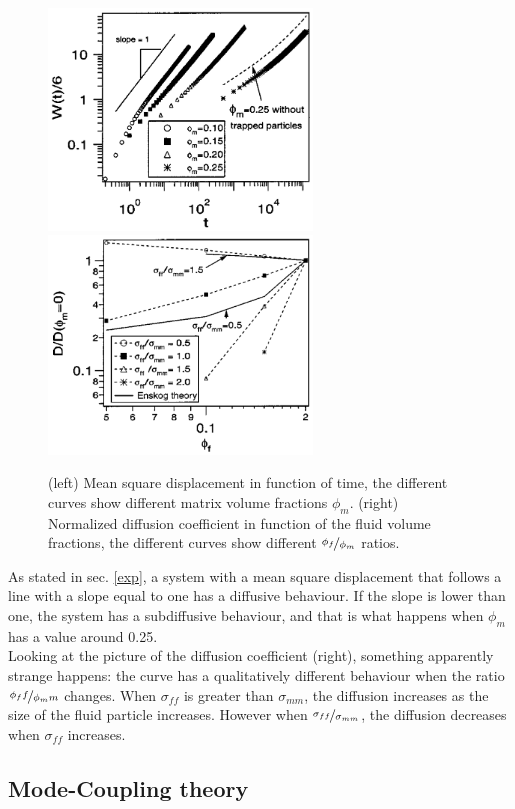\documentclass[a4paper,12pt]{article}
\begin{document}
\begin{figure}[htbp]
\centering
\subfigure
{\includegraphics[width=7cm]{pics/msd_mm.png}}
\subfigure
{\includegraphics[width=7cm]{pics/ndc_mm.png}}
\caption{(left) Mean square displacement in function of time, the different curves show different matrix volume fractions $\phi_m$. (right) Normalized diffusion coefficient in function of the fluid volume fractions, the different curves show different $\nicefrac{\phi_f}{\phi_m}$ ratios.}
\label{msd mm}
\end{figure}

As stated in sec. \ref{exp}, a system with a mean square displacement that follows a line with a slope equal to one has a diffusive behaviour. If the slope is lower than one, the system has a subdiffusive behaviour, and that is what happens when $\phi_m$ has a value around 0.25.\\

Looking at the picture of the diffusion coefficient (right), something apparently strange happens: the curve has a qualitatively different behaviour when the ratio $\nicefrac{\phi_ff}{\phi_mm}$ changes. When $\sigma_{ff}$ is greater than $\sigma_{mm}$, the diffusion increases as the size of the fluid particle increases. However when $\nicefrac{\sigma_{ff}}{\sigma_{mm}}$, the diffusion decreases when $\sigma_{ff}$ increases.

\subsection{Mode-Coupling theory}
\label{mct}
\end{document}
